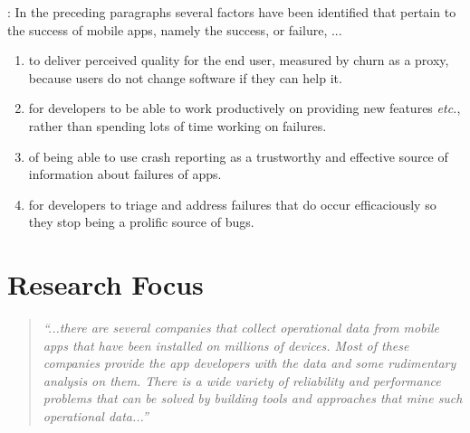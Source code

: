 
\medskip
{}: %
In the preceding paragraphs several factors have been identified that pertain to the success of mobile apps, namely the success, or failure, ...
\begin{enumerate}
    \item to deliver perceived quality for the end user, measured by churn as a proxy, because users do not change software if they can help it. %
    \item for developers to be able to work productively on providing new features \emph{etc.}, rather than spending lots of time working on failures.
    \item of being able to use crash reporting as a trustworthy and effective source of information about failures of apps.
    \item for developers to triage and address failures that do occur efficaciously so they stop being a prolific source of bugs.
\end{enumerate}

\section{Research Focus}
\begin{quote}
    \emph{``...there are several companies that collect operational data from mobile apps that have been installed on millions of devices. Most of these companies provide the app developers with the data and some rudimentary analysis on them. There is a wide variety of reliability and performance problems that can be solved by building tools and approaches that mine such operational data...''}~ 
\end{quote} 

